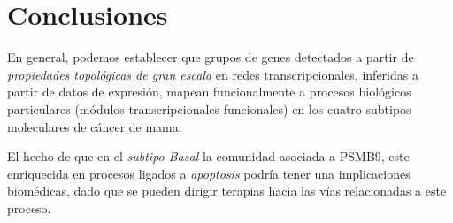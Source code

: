 \documentclass[a4paper,12pt]{article}
\begin{document}
\begin{figure}[!t]
\centering
\caption{}
\label{Basal_Procesos-Comunidades}
\end{figure}

\section{Conclusiones}

En general, podemos establecer que grupos de genes detectados a partir de \emph{propiedades topológicas de gran escala} en redes transcripcionales, inferidas a partir de datos de expresión, mapean funcionalmente a procesos biológicos particulares (módulos transcripcionales funcionales) en los cuatro subtipos moleculares de cáncer de mama.

El hecho de que en el \emph{subtipo Basal} la comunidad asociada a PSMB9, este enriquecida en procesos ligados a \emph{apoptosis} podría tener una implicaciones biomédicas, dado que se pueden dirigir terapias hacia las vías relacionadas a este proceso.
\end{document}
